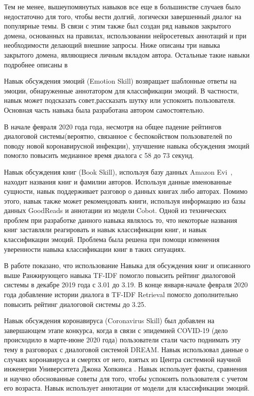 Тем не менее, вышеупомянутых навыков все еще в большинстве случаев было недостаточно для того, чтобы вести долгий, логически завершенный диалог на популярные темы. В связи с этим также был создан ряд навыков закрытого домена, основанных на правилах, использовании нейросетевых аннотаций и при необходимости делающий внешние запросы. Ниже описаны три навыка закрытого домена, являющиеся личным вкладом автора. Остальные такие навыки подробнее описаны в~\cite{dream1,dream1_trudy}

Навык обсуждения эмоций (Emotion Skill) возвращает шаблонные ответы на эмоции, обнаруженные аннотатором для классификации эмоций. В частности, навык может подсказать совет,рассказать шутку или успокоить пользователя. Основная часть навыка была разработана автором самостоятельно.

В начале февраля 2020 года года, несмотря на общее падение рейтингов диалоговой системы(вероятно, связанное  с беспокойством пользователей по поводу новой коронавирусной инфекции), улучшение навыка обсуждения эмоций помогло повысить медианное время диалога с 58 до 73 секунд.

Навык обсуждения книг (Book Skill), используя базу данных Amazon Evi~\cite{na_website_nds}, находит названия книг и фамилии авторов. Используя данные именованные сущности, навык поддерживает разговор о данных книгах либо авторах. Помимо этого, навык также может рекомендовать книги, используя информацию из базы данных GoodReads \cite{na_website_ndt} и аннотации из модели Cobot. Одной из технических проблем при разработке данного навыка являлось то, что некоторые названия книг заставляли реагировать и навык классификации книг, и навык классификации эмоций. Проблема была решена при помощи изменения уверенности навыка классификации книг в таких ситуациях.

В работе \cite{dream1} показано, что использование Навыка для обсуждения книг и описанного выше Ранжирующего навыка TF-IDF помогло повысить рейтинг диалоговой системы в декабре 2019 года с 3.01 до 3.19.  В конце января-начале февраля 2020 года добавление истории диалога в TF-IDF Retrieval помогло дополнительно повысить рейтинг диалоговой системы до 3.25.

Навык обсуждения коронавируса (Coronavirus Skill) был добавлен на завершающем этапе конкурса, когда в связи с эпидемией COVID-19 (дело происходило в марте-июне 2020 года) пользователи стали часто поднимать эту тему в разговорах с диалоговой системой DREAM. Навык использовал данные о случаях коронавируса и смертях от него, взятых из Центра системной научной инженерии Университета Джона Хопкинса \cite{na_website_ndr}. Навык использует факты, сравнения и научно обоснованные советы для того, чтобы успокоить пользователя с учетом его возраста. Навык использует аннотации от модели для классификации эмоций.

